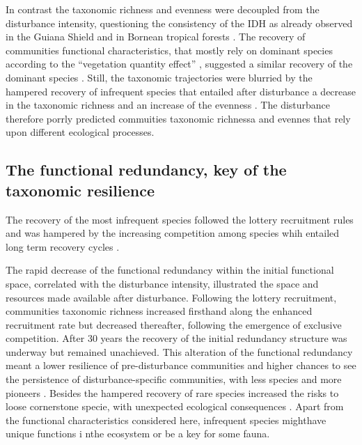 \documentclass[fleqn,10pt]{ArtEcoFoG} %
\theoremstyle{definition}
\theoremstyle{definition}
\theoremstyle{definition}
\theoremstyle{remark}
\begin{document}
In contrast the taxonomic richness and evenness were decoupled from the
disturbance intensity, questioning the consistency of the IDH as already
observed in the Guiana Shield \citep{Baraloto2012a} and in Bornean
tropical forests \citep{Cannon1998}. The recovery of communities
functional characteristics, that mostly rely on dominant species
according to the ``vegetation quantity effect'' \citep{Grime1998},
suggested a similar recovery of the dominant species \citep{Molino2001}.
Still, the taxonomic trajectories were blurried by the hampered recovery
of infrequent species that entailed after disturbance a decrease in the
taxonomic richness and an increase of the evenness
\citep{Hubbell2001, Chave2004}. The disturbance therefore porrly
predicted commuities taxonomic richnessa and evennes that rely upon
different ecological processes.

\subsection{The functional redundancy, key of the taxonomic
resilience}\label{the-functional-redundancy-key-of-the-taxonomic-resilience}

The recovery of the most infrequent species followed the lottery
recruitment rules \citep{Busing2002} and was hampered by the increasing
competition among species whih entailed long term recovery cycles
\citep{Trenbath1999, Elmqvist2003, Diaz2005}.

The rapid decrease of the functional redundancy within the initial
functional space, correlated with the disturbance intensity, illustrated
the space and resources made available after disturbance. Following the
lottery recruitment, communities taxonomic richness increased firsthand
along the enhanced recruitment rate but decreased thereafter, following
the emergence of exclusive competition. After 30 years the recovery of
the initial redundancy structure was underway but remained unachieved.
This alteration of the functional redundancy meant a lower resilience of
pre-disturbance communities and higher chances to see the persistence of
disturbance-specific communities, with less species and more pioneers
\citep{Haddad2008, Burslem2000, Martin2013}. Besides the hampered
recovery of rare species increased the risks to loose cornerstone
specie, with unexpected ecological consequences
\citep{Jones1994, Chazdon2003a, Diaz2005, Gardner2007}. Apart from the
functional characteristics considered here, infrequent species mighthave
unique functions i nthe ecosystem or be a key for some fauna.
\end{document}

